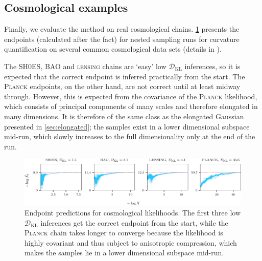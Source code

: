 \documentclass[usenatbib]{mnras}
\newcommand{\DKL}{\mathcal{D}_\mathrm{KL}}
\begin{document}
\subsection{Cosmological examples}
Finally, we evaluate the method on real cosmological chains. \cref{fig:lcdm_logXfs} presents the endpoints (calculated after the fact) for nested sampling runs for curvature quantification on several common cosmological data sets (details in \citet{curvature_tension}). 
\par
The \textsc{SH0ES}, \textsc{BAO} and \textsc{lensing} chains are `easy' low $\DKL$ inferences, so it is expected that the correct endpoint is inferred practically from the start. The \textsc{Planck} endpoints, on the other hand, are not correct until at least midway through. However, this is expected from the covariance of the \textsc{Planck} likelihood, which consists of principal components of many scales and therefore elongated in many dimensions. It is therefore of the same class as the elongated Gaussian presented in \cref{sec:elongated}; the samples exist in a lower dimensional subspace mid-run, which slowly increases to the full dimensionality only at the end of the run.
\begin{figure}
\begin{center}
    \includegraphics{figures/lcdm_logXfs.pdf}
\end{center}
\caption{Endpoint predictions for cosmological likelihoods. The first three low $\DKL$ inferences get the correct endpoint from the start, while the \textsc{Planck} chain takes longer to converge because the likelihood is highly covariant and thus subject to anisotropic compression, which makes the samples lie in a lower dimensional subspace mid-run.}
\label{fig:lcdm_logXfs}
\end{figure}
\end{document}
